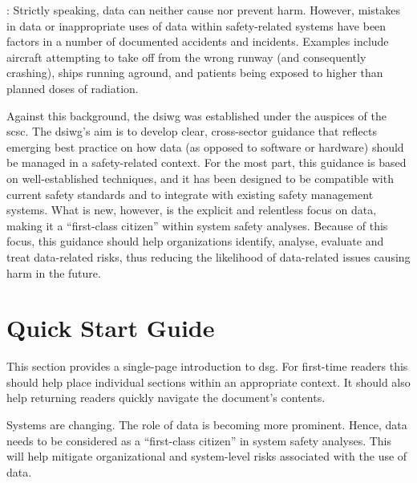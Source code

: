 : Strictly speaking,
data can neither cause nor prevent harm.
However, mistakes in data or inappropriate uses of data within safety-related systems have been factors in a number of documented accidents and incidents. Examples include aircraft attempting to take off from the wrong runway (and consequently crashing), ships running aground, and patients being exposed to higher than planned doses of radiation.

Against this background, the \gls{dsiwg} was established under the auspices of the \gls{scsc}. The \gls{dsiwg}'s aim is to develop clear, cross-sector guidance that reflects emerging best practice on how data (as opposed to software or hardware) should be managed in a safety-related context.
For the most part, this guidance is based on well-established techniques,
and it has been designed to be compatible with current safety standards and to integrate with existing safety management systems.
What is new, however, is the explicit and relentless focus on data, making it a ``first-class citizen'' within system safety analyses.
Because of this focus, this guidance should help organizations identify, analyse, evaluate and treat data-related risks, thus reducing the likelihood of data-related issues causing harm in the future.

\clearpage
\section*{Quick Start Guide}
\pagestyle{ContinuationPageFrontMatter}


This section provides a single-page introduction to \gls{dsg}. For first-time readers this should help place individual sections within an appropriate context. It should also help returning readers quickly navigate the document's contents.



Systems are changing. The role of data is becoming more prominent. Hence, data needs to be considered as a ``first-class citizen'' in system safety analyses. This will help mitigate organizational and system-level risks associated with the use of data.

